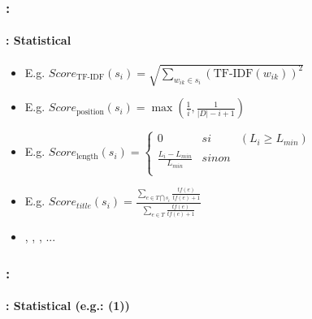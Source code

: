 \documentclass[xcolor=table]{beamer}
\begin{document}
\begin{frame}
	\frametitle{\insertshortsubtitle: \insertsection}
	\framesubtitle{\insertsubsection: Statistical}
	
	\begin{itemize}
		\item {} 
		
		\hspace{.5cm}E.g. $Score_\text{TF-IDF}(s_i) = \sqrt{\sum\limits_{w_{ik} \in s_i} (\text{TF-IDF}(w_{ik}))^2}$
		
		\item {}
		
		\hspace{.5cm}E.g. $ Score_\text{position}(s_i) = \max (\frac{1}{i}, \frac{1}{|D| - i + 1}) $
		
		\item {}
		
		\hspace{.5cm}E.g. $ Score_\text{length}(s_i) = \left\lbrace 
		\begin{array}{lll}
		0 & si & (L_i \geq L_{min}) \\
		\frac{L_i - L_{min}}{L_{min}} & sinon & \\
		\end{array}
		\right. $
		
		\item {}
		
		\hspace{.5cm}E.g. $ Score_{title}(s_i) = \frac{\sum_{e \in T \bigcap s_i}{\frac{tf(e)}{tf(e)+1}}}
		{\sum_{e \in T}{\frac{tf(e)}{tf(e)+1}}} $
		
		\item {}, , , ...
	\end{itemize}

\end{frame}

\begin{frame}
	\frametitle{\insertshortsubtitle: \insertsection}
	\framesubtitle{\insertsubsection: Statistical (e.g.: \cite{13-aries-al} (1))}
	
	
\end{frame}
\end{document}
